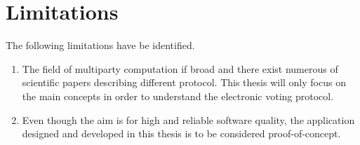 \section{Limitations}

The following limitations have be identified.

\begin{enumerate}
    \item The field of multiparty computation if broad and there exist numerous of scientific papers describing different protocol. This thesis will only focus on the main concepts in order to understand
    the electronic voting protocol. 
    
    \item Even though the aim is for high and reliable software quality, the application designed and developed in this thesis is to be considered proof-of-concept. 
\end{enumerate}